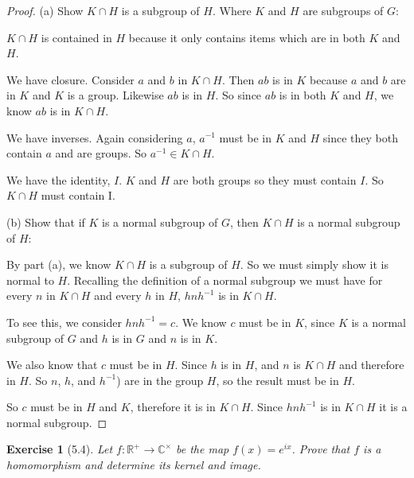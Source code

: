 \documentclass[12pt,leqno]{article}
\numberwithin{equation}{section}
\newtheorem*{exer}{Exercise}
\theoremstyle{definition}
\begin{document}
\begin{proof}[Proof]
    
\item[(a)] Show $K \cap H$ is a subgroup of $H$. Where $K$ and $H$ are
    subgroups of $G$:

    $K \cap H$ is contained in $H$ because it only contains items
    which are in both $K$ and $H$.

    We have closure. Consider $a$ and $b$ in $K \cap H$. Then $ab$ is in $K$
    because $a$ and $b$ are in $K$ and $K$ is a group. Likewise $ab$ is in
    $H$. So since $ab$ is in both $K$ and $H$, we know $ab$ is in $K \cap H$.

    We have inverses. Again considering $a$, $a^{-1}$ must be in $K$ and $H$
    since they both contain $a$ and are groups. So $a^{-1} \in K \cap H$. 

    We have the identity, $I$. $K$ and $H$ are both groups so they must contain
    $I$. So $K \cap H$ must contain I.

\item[(b)] Show that if $K$ is a normal subgroup of $G$, then $K \cap H$ is a
    normal subgroup of $H$:

    By part (a), we know $K \cap H$ is a subgroup of $H$. So we must simply
    show it is normal to $H$.  Recalling the definition of a normal subgroup we
    must have for every $n$ in $K \cap H$ and every $h$ in $H$, $hnh^{-1}$ is
    in $K \cap H$.

    To see this, we consider $hnh^{-1} = c$. We know $c$ must be in $K$, since
    $K$ is a normal subgroup of $G$ and $h$ is in $G$ and $n$ is in $K$. 
    
    We also know that $c$ must be in $H$. Since $h$ is in $H$, and $n$ is $K
    \cap H$ and therefore in $H$. So $n$, $h$, and $h^{-1}$) are in the group
    $H$, so the result must be in $H$.

    So $c$ must be in $H$ and $K$, therefore it is in $K \cap H$. Since
    $hnh^{-1}$ is in $K \cap H$ it is a normal subgroup.
    
\end{proof}


\begin{exer}[5.4]
Let $f:\mathbb R^{+} \rightarrow \mathbb C^{\times}$ be the map $f(x)=e^{ix}$. Prove that $f$ is a homomorphism and determine its kernel and image.
\end{exer}
\end{document}
